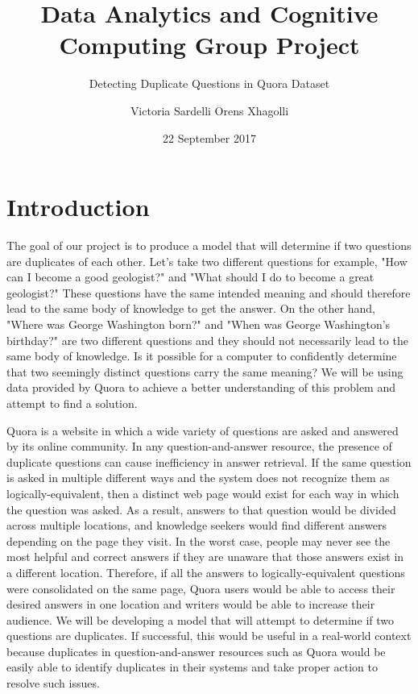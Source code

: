 \documentclass{sig-alternate}
\begin{document}
\title{Data Analytics and Cognitive Computing Group Project}
\subtitle{Detecting Duplicate Questions in Quora Dataset}
\author{
\alignauthor
Victoria Sardelli
\alignauthor
Orens Xhagolli
}
\date{22 September 2017}
\maketitle

\section{Introduction}
\label{introduction}
The goal of our project is to produce a model that will determine if two questions are duplicates of each other. Let's take two different questions for example, "How can I become a good geologist?" and "What should I do to become a great geologist?" These questions have the same intended meaning and should therefore lead to the same body of knowledge to get the answer. On the other hand, "Where was George Washington born?" and "When was George Washington's birthday?" are two different questions and they should not necessarily lead to the same body of knowledge. Is it possible for a computer to confidently determine that two seemingly distinct questions carry the same meaning? We will be using data provided by Quora to achieve a better understanding of this problem and attempt to find a solution.

Quora is a website in which a wide variety of questions are asked and answered by its online community. In any question-and-answer resource, the presence of duplicate questions can cause inefficiency in answer retrieval. If the same question is asked in multiple different ways and the system does not recognize them as logically-equivalent, then a distinct web page would exist for each way in which the question was asked. As a result, answers to that question would be divided across multiple locations, and knowledge seekers would find different answers depending on the page they visit. In the worst case, people may never see the most helpful and correct answers if they are unaware that those answers exist in a different location. Therefore, if all the answers to logically-equivalent questions were consolidated on the same page, Quora users would be able to access their desired answers in one location and writers would be able to increase their audience. We will be developing a model that will attempt to determine if two questions are duplicates. If successful, this would be useful in a real-world context because duplicates in question-and-answer resources such as Quora would be easily able to identify duplicates in their systems and take proper action to resolve such issues.
\end{document}
